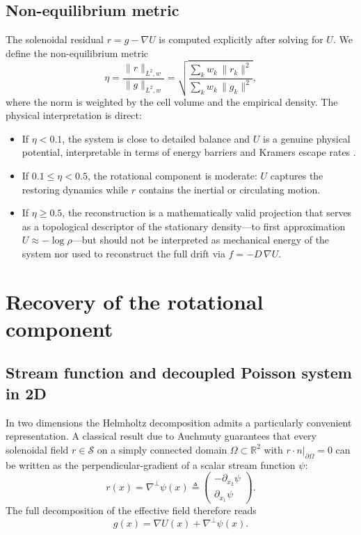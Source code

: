 \documentclass[11pt,a4paper]{article}
\newcommand{\R}{\mathbb{R}}
\newcommand{\grad}{\nabla}
\newcommand{\perpgrad}{\nabla^{\!\perp}}
\newcommand{\norm}[1]{\lVert #1 \rVert}
\begin{document}
\subsection{Non-equilibrium metric}

The solenoidal residual $r = g - \grad U$ is computed explicitly after solving
for $U$. We define the non-equilibrium metric
\begin{equation}
\eta = \frac{\norm{r}_{L^2,w}}{\norm{g}_{L^2,w}}
= \sqrt{\frac{\sum_k w_k\, \norm{r_k}^2}{\sum_k w_k\, \norm{g_k}^2}},
\label{eq:eta}
\end{equation}
where the norm is weighted by the cell volume and the empirical density. The
physical interpretation is direct:
\begin{itemize}
\item If $\eta < 0.1$, the system is close to detailed balance and $U$ is a
genuine physical potential, interpretable in terms of energy barriers and
Kramers escape rates \cite{risken1989}.
\item If $0.1 \le \eta < 0.5$, the rotational component is moderate: $U$
captures the restoring dynamics while $r$ contains the inertial or circulating
motion.
\item If $\eta \ge 0.5$, the reconstruction is a mathematically valid
projection that serves as a topological descriptor of the stationary
density---to first approximation $U \approx -\log\rho$---but should not be
interpreted as mechanical energy of the system nor used to reconstruct the
full drift via $f = -D\,\grad U$.
\end{itemize}

\section{Recovery of the rotational component}

\subsection{Stream function and decoupled Poisson system in 2D}

In two dimensions the Helmholtz decomposition admits a particularly convenient
representation. A classical result due to Auchmuty \cite{auchmuty2016}
guarantees that every solenoidal field $r \in \mathcal{S}$ on a simply
connected domain $\Omega \subset \R^2$ with $r \cdot n|_{\partial\Omega} = 0$
can be written as the perpendicular-gradient of a scalar stream function
$\psi$:
\begin{equation}
r(x) = \perpgrad \psi(x) \triangleq
\begin{pmatrix} -\partial_{x_2}\psi \\ \partial_{x_1}\psi \end{pmatrix}.
\label{eq:stream_function}
\end{equation}
The full decomposition of the effective field therefore reads
\begin{equation}
g(x) = \grad U(x) + \perpgrad \psi(x).
\label{eq:hodge_2d}
\end{equation}
\end{document}
